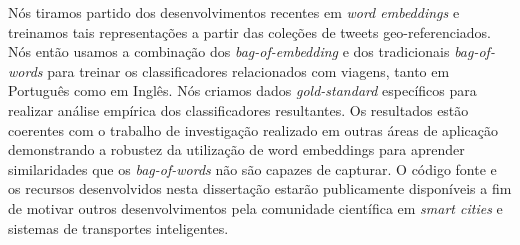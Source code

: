 Nós tiramos partido dos desenvolvimentos recentes em \textit{word embeddings} e treinamos tais representações a partir das coleções de tweets geo-referenciados. Nós então usamos a combinação dos \textit{bag-of-embedding} e dos tradicionais \textit{bag-of-words} para treinar os classificadores relacionados com viagens, tanto em Português como em Inglês. Nós criamos dados \textit{gold-standard} específicos para realizar análise empírica dos classificadores resultantes. Os resultados estão coerentes com o trabalho de investigação realizado em outras áreas de aplicação demonstrando a robustez da utilização de word embeddings para aprender similaridades que os \textit{bag-of-words} não são capazes de capturar. O código fonte e os recursos desenvolvidos nesta dissertação estarão publicamente disponíveis a fim de motivar outros desenvolvimentos pela comunidade científica em \textit{smart cities} e sistemas de transportes inteligentes.